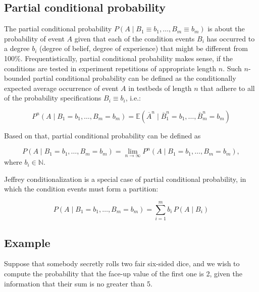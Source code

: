 \subsection{Partial conditional probability}
\label{sss:part-0c07}




The partial conditional probability $P(A\mid B _1 \equiv b _1, \ldots, B _m \equiv b _m)$
is about the probability of event $A$ given that each of the condition events $B _i$ has
occurred to a degree $b _i$ (degree of belief, degree of experience) that might be
different from 100\%. Frequentistically, partial conditional probability makes sense, if
the conditions are tested in experiment repetitions of appropriate length $n$. Such
$n$-bounded partial conditional probability can be defined as the conditionally expected
average occurrence of event $A$ in testbeds of length $n$ that adhere to all of the
probability specifications $B _i \equiv b _i$, i.e.:

\[
P^n\!\left(A \mid B_1 = b_1, \ldots, B_m = b_m\right)
=
\mathbb{E}\!\left(\overline{A}^n \mid \overline{B}_1^n = b_1, \ldots, \overline{B}_m^n = b_m\right)
\]

Based on that, partial conditional probability can be defined as

\[
P\!\left(A \mid B_1 = b_1, \ldots, B_m = b_m\right)
=
\lim_{n \to \infty}
P^n\!\left(A \mid B_1 = b_1, \ldots, B_m = b_m\right),
\]
where \(b_i \in \mathbb{N}\).



Jeffrey conditionalization is a special case of partial conditional probability, in which
the condition events must form a partition:



\[
P\!\left(A \mid B_1 = b_1, \ldots, B_m = b_m\right)
=
\sum_{i=1}^{m} b_i\, P\!\left(A \mid B_i\right)
\]




\subsection{Example}
\label{sss:exam-1a79}




Suppose that somebody secretly rolls two fair six-sided dice, and we wish to compute the
probability that the face-up value of the first one is 2, given the information that their
sum is no greater than 5.



